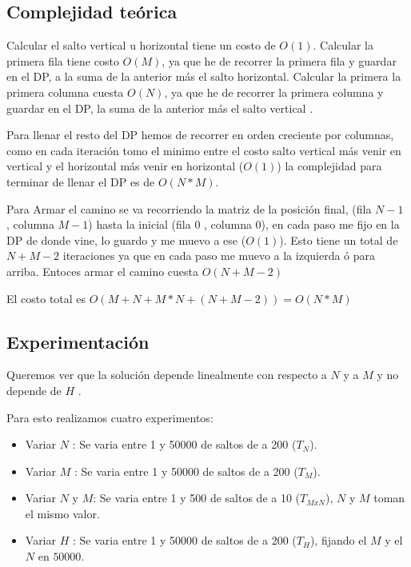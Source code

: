     \subsection{Complejidad teórica}

    Calcular el salto vertical u horizontal tiene un costo de $O(1)$. Calcular la primera fila tiene costo $O(M)$, ya que he de recorrer la primera fila y guardar en el DP, a la suma de la anterior más el salto horizontal. Calcular la primera la primera columna cuesta $O(N)$, ya que he de recorrer la primera columna y guardar en el DP,  la suma de la anterior más el salto vertical .

    Para llenar el resto del DP hemos de recorrer en orden creciente por columnas, como en cada iteración tomo el minimo entre el costo salto vertical más venir en vertical y el horizontal más venir en horizontal ($O(1)$) la complejidad para terminar de llenar el DP es de $O(N*M)$.

    Para Armar el camino se va recorriendo la matriz de la posición final, (fila $N - 1$ , columna $M - 1$) hasta la inicial (fila $0$ , columna $0$), en cada paso me fijo en la DP de donde vine, lo guardo y me muevo a ese ($O(1)$). Esto tiene un total de $N + M - 2$ iteraciones ya que en cada paso me muevo a la izquierda ó para arriba. Entoces armar el camino cuesta $O(N + M - 2)$

    El costo total es $O( M + N + M*N + (N + M − 2) ) = O(N*M)$
     
    \subsection{Experimentación}
    Queremos ver que la solución depende linealmente con respecto a $N$ y a $M$ y no depende de $H$ .

    Para esto realizamos cuatro experimentos:
    \begin{itemize}
        \item Variar $N$ : Se varia entre 1 y 50000 de saltos de a 200 ($T_N$).
        \item Variar $M$ : Se varia entre 1 y 50000 de saltos de a 200 ($T_M$).
        \item Variar $N$ y $M$: Se varia entre 1 y 500 de saltos de a 10 ($T_{MxN}$), $N$ y $M$ toman el mismo valor.
        \item Variar $H$ : Se varia entre 1 y 50000 de saltos de a 200 ($T_H$), fijando el $M$ y el $N$ en $50000$.
    \end{itemize}

